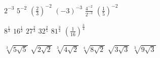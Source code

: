 \documentclass[12pt,a4paper]{article}
\begin{document}
	{$2^{-3}$}
	{$5^{-2}$}
	{$\left(\frac{2}{3}\right)^{-2}$}
	{$(-3)^{-3}$}
	{$\frac{4^{-2}}{2^{-3}}$}
	{$\left(\frac{1}{5}\right)^{-2}$}
	
	{$8^{\frac{1}{3}}$}
	{$16^{\frac{1}{2}}$}
	{$27^{\frac{2}{3}}$}
	{$32^{\frac{2}{5}}$}
	{$81^{\frac{3}{4}}$}
	{$\left(\frac{1}{16}\right)^{\frac{3}{4}}$}
	
	{$\sqrt[3]{5\sqrt{5}}$}
	{$\sqrt{2\sqrt{2}}$}
	{$\sqrt[3]{4\sqrt{2}}$}
	{$\sqrt[4]{8\sqrt{2}}$}
	{$\sqrt{3\sqrt{3}}$}
	{$\sqrt[3]{9\sqrt{3}}$}
	
\end{document}
